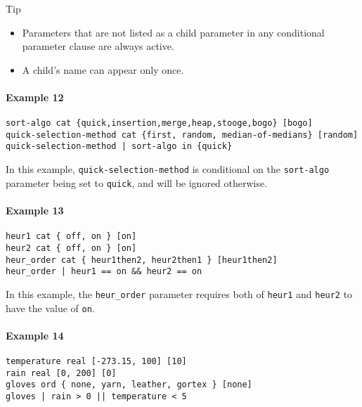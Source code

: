 \documentclass[manual.tex]{subfiles}
\begin{document}
\begin{bclogo}[logo=\bclampe, couleurBarre=red, noborder=true]{Tip}
\begin{itemize}
\item Parameters that are not listed as a child parameter in any conditional parameter clause are always active.
\item A child's name can appear only once.
\end{itemize}
\end{bclogo}



\paragraph{Example 12}

\begin{verbatim}
sort-algo cat {quick,insertion,merge,heap,stooge,bogo} [bogo]
quick-selection-method cat {first, random, median-of-medians} [random]
quick-selection-method | sort-algo in {quick}
\end{verbatim}
In this example, \texttt{quick-selection-method} is conditional on the \texttt{sort-algo} parameter being set to \texttt{quick}, and will be ignored otherwise.

\paragraph{Example 13}

\begin{verbatim}
heur1 cat { off, on } [on]
heur2 cat { off, on } [on]
heur_order cat { heur1then2, heur2then1 } [heur1then2]
heur_order | heur1 == on && heur2 == on
\end{verbatim}

In this example, the \texttt{heur\_order} parameter requires both of \texttt{heur1} and \texttt{heur2} to have the value of \texttt{on}.

\paragraph{Example 14}
\begin{verbatim}
temperature real [-273.15, 100] [10]
rain real [0, 200] [0]
gloves ord { none, yarn, leather, gortex } [none]
gloves | rain > 0 || temperature < 5
\end{verbatim}
\end{document}
